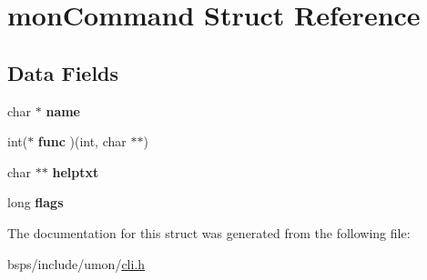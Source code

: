 \hypertarget{structmonCommand}{}\section{mon\+Command Struct Reference}
\label{structmonCommand}
\subsection*{Data Fields}
\begin{DoxyCompactItemize}
\item 
\mbox{\label{structmonCommand_ae3379482832b0315470e0481e3da83e4}} 
char $\ast$ {\bfseries name}
\item 
\mbox{\label{structmonCommand_a721ad152e1dbcdbbf7dceb574dd22450}} 
int($\ast$ {\bfseries func} )(int, char $\ast$$\ast$)
\item 
\mbox{\label{structmonCommand_a374a10d76718899bd0632e80709b38b8}} 
char $\ast$$\ast$ {\bfseries helptxt}
\item 
\mbox{\label{structmonCommand_a909ba72264878bd2698d54f13d52b7d7}} 
long {\bfseries flags}
\end{DoxyCompactItemize}


The documentation for this struct was generated from the following file\+:\begin{DoxyCompactItemize}
\item 
bsps/include/umon/\mbox{\hyperlink{cli_8h}{cli.\+h}}\end{DoxyCompactItemize}

